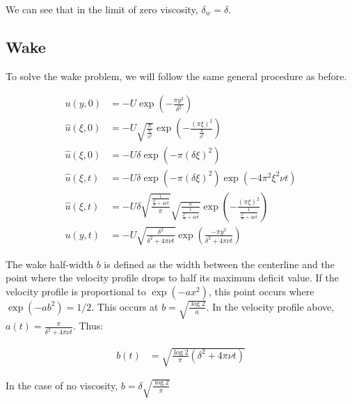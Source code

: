 \documentclass{article}
\begin{document}
We can see that in the limit of zero viscosity, $\delta_w = \delta$.

\subsection{Wake}

To solve the wake problem, we will follow the same general procedure
	as before.

\begin{align}
u(y,0) & = -U\exp\left(-\frac{\pi y^2}{\delta^2} \right)\\
\hat{u}(\xi, 0) & = - U \sqrt{ \frac{\pi}{\frac{\pi}{\delta^2}}}
	\exp \left( - \frac{ (\pi \xi)^2}{ \frac{\pi}{\delta^2}} \right)
	\nonumber \\
\hat{u}(\xi, 0)& = - U \delta \exp \left( - 
	\pi \left( \delta \xi \right)^2 \right) \\	
\hat{u}(\xi, t) & = - U \delta 
	\exp \left( - \pi \left( \delta \xi \right)^2 \right)
	\exp \left( - 4 \pi^2 \xi^2 \nu t \right) \nonumber\\
\hat{u}(\xi, t) & = - U \delta
	\sqrt{ \frac{\frac{1}{ \frac{\delta^2}{\pi} + 4 \nu t}}{\pi}}
	\sqrt{ \frac{\pi}{ \frac{1}{ \frac{\delta^2}{\pi} + 4 \nu t}}}
	\exp \left( - \frac{ ( \pi \xi )^2}
	{ \frac{1}{ \frac{\delta^2}{\pi} + 4 \nu t}} \right) \nonumber\\
u(y, t) & = - U \sqrt{ \frac{\delta^2}{ \delta^2 + 4 \pi \nu t}}
	\exp \left( \frac{-\pi y^2}{ \delta^2 + 4 \pi \nu t} \right)
\end{align}

The wake half-width $b$ is defined as the width between the centerline
	and the point where the velocity profile drops to half its
	maximum deficit value.
If the velocity profile is proportional to $\exp(-a x^2)$, this point occurs
	where $\exp(-a b^2) = 1/2$.  
This occurs at $b = \sqrt{\frac{\log 2}{a}}$.
In the velocity profile above, $a(t) = \frac{\pi}{\delta^2 + 4 \pi \nu t}$.
Thus:

\begin{align}
b(t) & = \sqrt{ \frac{ \log 2}{\pi} \left( \delta^2 + 4 \pi \nu t \right) }
\end{align}

In the case of no viscosity, $b = \delta \sqrt{\frac{\log 2}{\pi}}$
\end{document}

